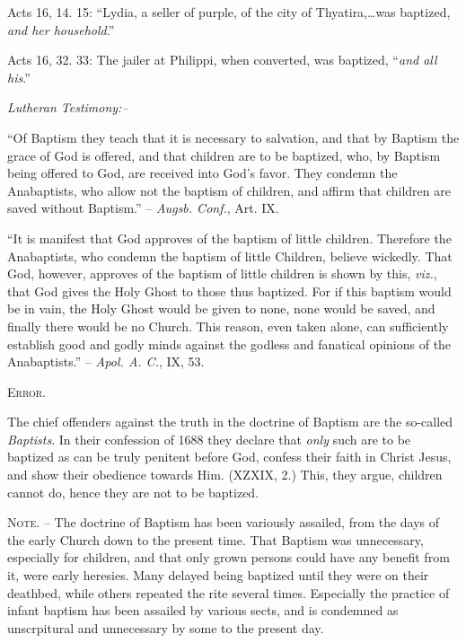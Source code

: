 \documentclass[
]{book}
\begin{document}
Acts 16, 14. 15: ``Lydia, a seller of purple, of the city of Thyatira,\ldots was baptized, \emph{and her household}.''

Acts 16, 32. 33: The jailer at Philippi, when converted, was baptized, ``\emph{and all his}.''

\begin{center}
\textsl{Lutheran Testimony:--}
\end{center}

``Of Baptism they teach that it is necessary to salvation, and that by Baptism the grace of God is offered, and that children are to be baptized, who, by Baptism being offered to God, are received into God's favor. They condemn the Anabaptists, who allow not the baptism of children, and affirm that children are saved without Baptism.'' -- \emph{Augsb. Conf.}, Art. IX.

``It is manifest that God approves of the baptism of little children. Therefore the Anabaptists, who condemn the baptism of little Children, believe wickedly. That God, however, approves of the baptism of little children is shown by this, \emph{viz.}, that God gives the Holy Ghost to those thus baptized. For if this baptism would be in vain, the Holy Ghost would be given to none, none would be saved, and finally there would be no Church. This reason, even taken alone, can sufficiently establish good and godly minds against the godless and fanatical opinions of the Anabaptists.'' -- \emph{Apol. A. C.}, IX, 53.

\begin{center}
\textsc{Error.}
\end{center}

The chief offenders against the truth in the doctrine of Baptism are the so-called \emph{Baptists}. In their confession of 1688 they declare that \emph{only} such are to be baptized as can be truly penitent before God, confess their faith in Christ Jesus, and show their obedience towards Him. (XZXIX, 2.) This, they argue, children cannot do, hence they are not to be baptized.

\textsc{Note. --} The doctrine of Baptism has been variously assailed, from the days of the early Church down to the present time. That Baptism was unnecessary, especially for children, and that only grown persons could have any benefit from it, were early heresies. Many delayed being baptized until they were on their deathbed, while others repeated the rite several times. Especially the practice of infant baptism has been assailed by various sects, and is condemned as unscrpitural and unnecessary by some to the present day.
\end{document}
